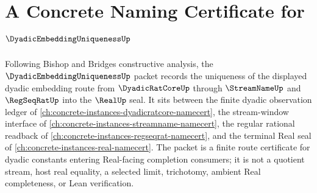 \chapter{A Concrete Naming Certificate for $\DyadicEmbeddingUniquenessUp$}
\label{ch:concrete-instances-dyadic-embedding-uniqueness-namecert}

Following Bishop and Bridges constructive analysis, the $\DyadicEmbeddingUniquenessUp$ packet records the uniqueness of the displayed dyadic embedding route from $\DyadicRatCoreUp$ through $\StreamNameUp$ and $\RegSeqRatUp$ into the $\RealUp$ seal. It sits between the finite dyadic observation ledger of \autoref{ch:concrete-instances-dyadicratcore-namecert}, the stream-window interface of \autoref{ch:concrete-instances-streamname-namecert}, the regular rational readback of \autoref{ch:concrete-instances-regseqrat-namecert}, and the terminal Real seal of \autoref{ch:concrete-instances-real-namecert}. The packet is a finite route certificate for dyadic constants entering Real-facing completion consumers; it is not a quotient stream, host real equality, a selected limit, trichotomy, ambient Real completeness, or Lean verification.

